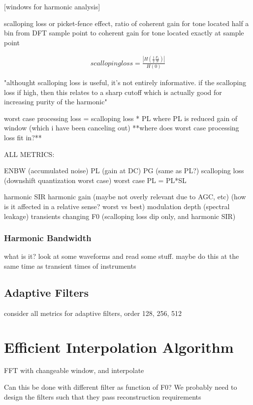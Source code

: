 \documentclass [11pt, proquest] {uwthesis}[2015/03/03]
\begin{document}
[windows for harmonic analysis]

scalloping loss or picket-fence effect, ratio of coherent gain for tone located half a bin from DFT sample point to coherent gain for tone located exactly at sample point

\begin{align}
scalloping loss = \frac{| H(\frac{1}{2} \frac{F_s}{N}) |}{H(0)}
\end{align}

"althought scalloping loss is useful, it's not entirely informative.  if the scalloping loss if high, then this relates to a sharp cutoff which is actually good for increasing purity of the harmonic"

worst case processing loss = scalloping loss * PL
where PL is reduced gain of window (which i have been canceling out)
**where does worst case processing loss fit in?**



ALL METRICS:

ENBW (accumulated noise)
PL (gain at DC)
PG (same as PL?)
scalloping loss (downshift quantization worst case)
worst case PL = PL*SL

harmonic SIR
harmonic gain (maybe not overly relevant due to AGC, etc)
					(how is it affected in a relative sense? worst vs best)
modulation depth (spectral leakage)
transients
changing F0 (scalloping loss dip only, and harmonic SIR)

\subsection{Harmonic Bandwidth}

what is it?  look at some waveforms and read some stuff.  maybe do this at the same time as transient times of instruments

\section{Adaptive Filters}

consider all metrics for adaptive filters, order 128, 256, 512


\chapter{Efficient Interpolation Algorithm}

FFT with changeable window, and interpolate

Can this be done with different filter as function of F0?
We probably need to design the filters such that they pass reconstruction requirements
\end{document}
